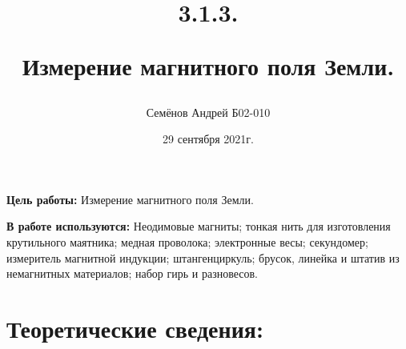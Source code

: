 \documentclass[a4paper,12pt]{article}
\begin{document}
\title{
3.1.3.

Измерение магнитного поля Земли.
\author{Семёнов Андрей Б02-010}
}
\date{29 сентября 2021г.}

\maketitle

\newpage

\textbf{Цель работы:} Измерение магнитного поля Земли.

		
\textbf{В работе используются:} Неодимовые магниты; тонкая нить для изготовления крутильного маятника; медная проволока; электронные весы; секундомер; измеритель магнитной индукции; штангенциркуль; брусок, линейка и штатив из немагнитных материалов; набор гирь и разновесов. 

\section{Теоретические сведения:}
\end{document}
